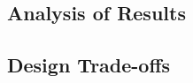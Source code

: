 \documentclass[12pt, a4paper, ukenglish]{article}
\begin{document}
    \subsection{Analysis of Results} \label{sec: analysis}
    


    
    \subsection{Design Trade-offs} \label{sec: trade-offs}
\end{document}
